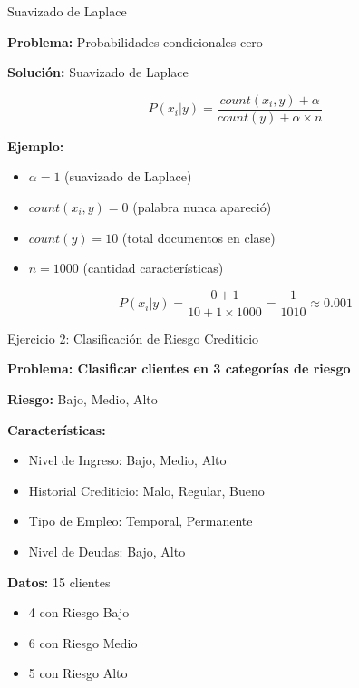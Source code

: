 \documentclass{beamer}
\begin{document}
\begin{frame}{Suavizado de Laplace}
    \begin{center}
        \textbf{Problema:} Probabilidades condicionales cero

        \textbf{Solución:} Suavizado de Laplace

        \[
        P(x_i|y) = \frac{count(x_i, y) + \alpha}{count(y) + \alpha \times n}
        \]
    \end{center}

    \textbf{Ejemplo:}
    \begin{itemize}
        \item $\alpha = 1$ (suavizado de Laplace)
        \item $count(x_i, y) = 0$ (palabra nunca apareció)
        \item $count(y) = 10$ (total documentos en clase)
        \item $n = 1000$ (cantidad características)
    \end{itemize}

    \[
    P(x_i|y) = \frac{0 + 1}{10 + 1 \times 1000} = \frac{1}{1010} \approx 0.001
    \]
\end{frame}

\begin{frame}{Ejercicio 2: Clasificación de Riesgo Crediticio}
    \begin{center}
        \textbf{Problema: Clasificar clientes en 3 categorías de riesgo}

        \vspace{0.3cm}

        \textbf{Riesgo:} Bajo, Medio, Alto
    \end{center}

    \textbf{Características:}
    \begin{itemize}
        \item Nivel de Ingreso: Bajo, Medio, Alto
        \item Historial Crediticio: Malo, Regular, Bueno
        \item Tipo de Empleo: Temporal, Permanente
        \item Nivel de Deudas: Bajo, Alto
    \end{itemize}

    \textbf{Datos:} 15 clientes
    \begin{itemize}
        \item 4 con Riesgo Bajo
        \item 6 con Riesgo Medio
        \item 5 con Riesgo Alto
    \end{itemize}
\end{frame}
\end{document}
